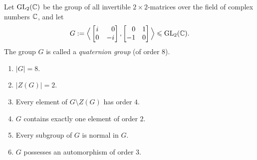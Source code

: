 \begin{exr}
    Let\/ $\text{GL}_2(\mathbb{C})$ be the group of all invertible\/ $2\times2$-matrices over the field of complex numbers\/ $\mathbb{C}$, and let
    $$
        G := \Big\langle\begin{bmatrix}
            i   & \hphantom-0\\
            0 & -i
        \end{bmatrix},
        \begin{bmatrix}
            \hphantom-0 & 1\\
            -1  &0
        \end{bmatrix}\Big\rangle\subgroup \text{GL}_2(\C).
    $$
    The group\/ $G$ is called a \textsl{quaternion group} (of order\/ $8$).
    \begin{enumerate}[\upshape a)]
        \item $|G| = 8$.
        \item $|Z(G)| = 2$.
        \item Every element of\/ $G \setminus Z(G)$ has order\/ $4$.
        \item $G$ contains exactly one element of order\/ $2$.
        \item Every subgroup of\/ $G$ is normal in\/ $G$.
        \item $G$ possesses an automorphism of order\/ $3$.
    \end{enumerate}
\end{exr}

